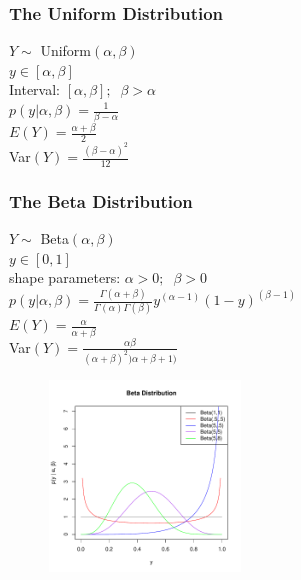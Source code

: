 \documentclass[handout]{beamer}
\begin{document}
\begin{frame}
\frametitle{The Uniform Distribution}
\pause
$Y \sim$ Uniform$(\alpha, \beta)$\\
\bigskip
\pause
$y \in [\alpha, \beta]$\\
\bigskip
\pause
Interval: $[\alpha, \beta]; \; \; \beta > \alpha$\\
\bigskip
\pause
$p(y| \alpha, \beta) = \frac{1}{\beta - \alpha}$\\
\bigskip
\bigskip
\pause
$E(Y) = \frac{\alpha + \beta}{2}$\\
\bigskip
\pause
Var$(Y) = \frac{(\beta - \alpha)^2}{12}$

\end{frame}



\begin{frame}
\frametitle{The Beta Distribution}
\begin{multicols}{2}
\pause
$Y \sim$ Beta$(\alpha, \beta)$\\
\bigskip
\pause
$y \in [0,1]$\\
\bigskip
\pause
shape parameters: $\alpha > 0; \; \; \beta > 0$\\
\bigskip
\pause
$p(y| \alpha, \beta) = \frac{\Gamma (\alpha + \beta)}{\Gamma (\alpha)
\Gamma (\beta)} y^{(\alpha - 1)} (1 - y)^{(\beta-1)}$\\
\bigskip
\bigskip
\pause
$E(Y) = \frac{\alpha}{\alpha + \beta}$\\
\bigskip
\pause
Var$(Y) = \frac{\alpha \beta}{(\alpha + \beta)^2 )\alpha + \beta + 1)}$


\begin{figure}[!htp]
\begin{center}
\includegraphics[width=2in, height=2in]{probability-beta.pdf}
\end{center}
\end{figure}
\end{multicols}

\end{frame}
\end{document}
